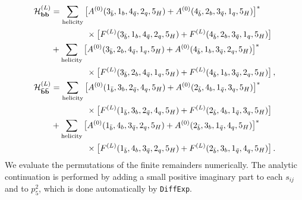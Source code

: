 \documentclass[main.tex]{subfiles}
\begin{document}
\begin{align}
%
\label{eq:channel_bb}
\mathcal{H}^{(L)}_{\mathbf{bb}} & =  \sumhel \big[ A^{(0)}(3_{\bar b},1_{b},4_{\bar{q}},2_{q} ,5_{H}) + A^{(0)}(4_{\bar b},2_{b},3_{\bar{q}},1_{q} ,5_{H}) \big]^*  \nn
                                &   \hspace{1.5cm} \times  \big[ F^{(L)}(3_{\bar b},1_{b},4_{\bar{q}},2_{q} ,5_{H}) + F^{(L)}(4_{\bar b},2_{b},3_{\bar{q}},1_{q} ,5_{H}) \big] \nn
                                &   +\sumhel \big[ A^{(0)}(3_{\bar b},2_{b},4_{\bar{q}},1_{q} ,5_{H}) + A^{(0)}(4_{\bar b},1_{b},3_{\bar{q}},2_{q} ,5_{H}) \big]^*  \nn
                                &   \hspace{1.5cm} \times  \big[ F^{(L)}(3_{\bar b},2_{b},4_{\bar{q}},1_{q} ,5_{H}) + F^{(L)}(4_{\bar b},1_{b},3_{\bar{q}},2_{q} ,5_{H}) \big] \,, \\
%
\label{eq:channel_BB}
\mathcal{H}^{(L)}_{\mathbf{\bar{b}\bar{b}}} & = \sumhel   \big[ A^{(0)}(1_{\bar b},3_{b},2_{\bar{q}},4_{q} ,5_{H}) + A^{(0)}(2_{\bar b},4_{b},1_{\bar{q}},3_{q} ,5_{H}) \big]^*  \nn
                                            &   \hspace{1.5cm} \times  \big[ F^{(L)}(1_{\bar b},3_{b},2_{\bar{q}},4_{q} ,5_{H}) + F^{(L)}(2_{\bar b},4_{b},1_{\bar{q}},3_{q} ,5_{H}) \big] \nn
                                            &  + \sumhel     \big[ A^{(0)}(1_{\bar b},4_{b},3_{\bar{q}},2_{q} ,5_{H}) + A^{(0)}(2_{\bar b},3_{b},1_{\bar{q}},4_{q} ,5_{H}) \big]^*  \nn
                                            &   \hspace{1.5cm} \times  \big[ F^{(L)}(1_{\bar b},4_{b},3_{\bar{q}},2_{q} ,5_{H}) + F^{(L)}(2_{\bar b},3_{b},1_{\bar{q}},4_{q} ,5_{H}) \big] \,.
\end{align}
\endgroup
We evaluate the permutations of the finite remainders numerically. The analytic continuation is performed by adding a small positive imaginary part to each $s_{ij}$ and to $p_5^2$, which is done automatically by \texttt{DiffExp}.
\end{document}
